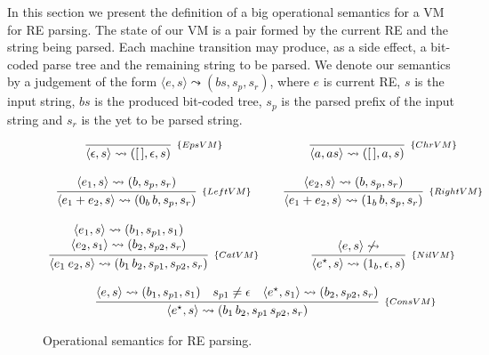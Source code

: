 \documentclass[oneside,12pt]{scrbook}
\theoremstyle{definition}
\theoremstyle{plain}
\theoremstyle{definition}
\begin{document}
In this section we present the definition of a big operational semantics for a VM for RE parsing.
The state of our VM is a pair formed by the current RE and the string being parsed. Each machine 
transition may produce, as a side effect, a bit-coded parse tree and the remaining string to be 
parsed. We denote our semantics by a judgement of the form $\langle e, s \rangle \leadsto (bs,s_p,s_r)$,
where $e$ is current RE, $s$ is the input string, $bs$ is the produced bit-coded tree, $s_p$ is
the parsed prefix of the input string and $s_r$ is the yet to be parsed string.

\begin{figure}[h]
	\[
	\begin{array}{ccc}
	\infer[_{\{EpsVM\}}]{\langle \epsilon, s\rangle \leadsto ([\,],\epsilon,s)}{} & &
	\infer[_{\{ChrVM\}}]{\langle a, as\rangle\leadsto ([\,],a,s)}{} \\ \\
	\infer[_{\{LeftVM\}}]{\langle e_1 + e_2,s\rangle\leadsto (0_b\,b,s_p,s_r)}{\langle e_1, s\rangle \leadsto (b,s_p,s_r)} & &
	\infer[_{\{RightVM\}}]{\langle e_1 + e_2,s\rangle\leadsto (1_b\,b,s_p,s_r)}{
		\langle e_2, s\rangle \leadsto (b,s_p,s_r)} \\ \\
	\infer[_{\{CatVM\}}]{\langle e_1\:e_2,s\rangle\leadsto (b_1\,b_2,s_{p1},s_{p2},s_r)}
	{\begin{array}{c}
		\langle e_1, s\rangle \leadsto (b_1,s_{p1},s_1) \\
		\langle e_2, s_1\rangle \leadsto (b_2,s_{p2},s_r)
		\end{array}} & & 
	\infer[_{\{NilVM\}}]{\langle e^\star, s\rangle\leadsto
		(1_b,\epsilon,s)}{\langle e, s \rangle
		\not\leadsto}\\ \\
	
	\multicolumn{3}{c}{
		\infer[_{\{ConsVM\}}]{\langle e^\star, s\rangle\leadsto (b_1\,b_2,s_{p1}\,s_{p2},s_r)}
		{\langle e, s \rangle \leadsto (b_1,s_{p1},s_1) & s_{p1} \neq \epsilon &
			\langle e^\star, s_1 \rangle \leadsto (b_2, s_{p2},s_r)}
	}
	\end{array}
	\]
	\caption{Operational semantics for RE parsing.}
	\label{figure:bigstepsemantics}
\end{figure}
\end{document}

